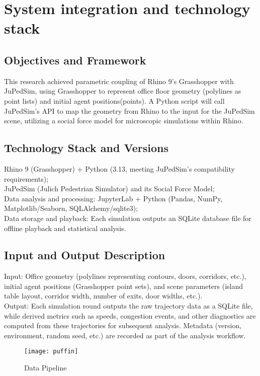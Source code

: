\section{System integration and technology stack}

\subsection{Objectives and Framework }
This research achieved parametric coupling of Rhino 9's Grasshopper with JuPedSim, using Grasshopper to represent office floor geometry (polylines as point lists) and initial agent positions(points). A Python script will call JuPedSim's API to map the geometry from Rhino to the input for the JuPedSim scene, utilizing a social force model for microscopic simulations within Rhino. 
\subsection{Technology Stack and Versions}
Rhino 9 (Grasshopper) + Python (3.13, meeting JuPedSim's compatibility requirements);
\\JuPedSim (Julich Pedestrian Simulator) and its Social Force Model; 
\\Data analysis and processing: JupyterLab + Python (Pandas, NumPy, Matplotlib/Seaborn, SQLAlchemy/sqlite3); 
\\Data storage and playback: Each simulation outputs an SQLite database file for offline playback and statistical analysis. 
\subsection{Input and Output Description }
Input: Office geometry (polylines representing contours, doors, corridors, etc.), initial agent positions (Grasshopper point sets), and scene parameters (island table layout, corridor width, number of exits, door widths, etc.). 
\\Output: Each simulation round outputs the raw trajectory data as a SQLite file, while derived metrics such as speeds, congestion events, and other diagnostics are computed from these trajectories for subsequent analysis. Metadata (version, environment, random seed, etc.) are recorded as part of the analysis workflow.
\begin{figure}[h]
    \centering
    \texttt{[image: puffin]}
    \caption{Data Pipeline}
    \label{fig:pipeline}
\end{figure}

